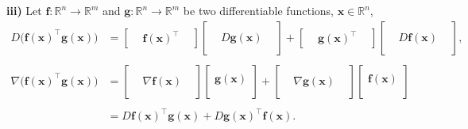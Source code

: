 \documentclass[12pt,thmsa]{article}
\begin{document}
\noindent
\textbf{iii)} Let \( \boldsymbol{f}: \mathbb{R}^{n} \rightarrow \mathbb{R}^{m}\) and \( \boldsymbol{g}: \mathbb{R}^{n} \rightarrow \mathbb{R}^{m}\) be two differentiable functions, \(\boldsymbol{x} \in \mathbb{R}^{n}\),
\[ 
\begin{aligned}
	D \bigg (\boldsymbol{f}(\boldsymbol{x})^{\top} \boldsymbol{g}(\boldsymbol{x}) \bigg )
	& = \left[ \begin{array}{ccc} & \boldsymbol{f}(\boldsymbol{x})^{\top} & \end{array} \right]
		\left[ \begin{array}{ccc} & & \\ & D \boldsymbol{g}(\boldsymbol{x}) & \\ & & \end{array} \right]
		+ \left[ \begin{array}{ccc} & \boldsymbol{g}(\boldsymbol{x})^{\top} & \end{array} \right]
		\left[ \begin{array}{ccc} & & \\ & 	D \boldsymbol{f}(\boldsymbol{x})  & \\ & & \end{array} \right], \\
	& \\
	\nabla \bigg (\boldsymbol{f}(\boldsymbol{x})^{\top} \boldsymbol{g}(\boldsymbol{x}) \bigg )
	& = \left[ \begin{array}{ccc} & & \\ &  \nabla \boldsymbol{f}(\boldsymbol{x}) & \\ & & \end{array} \right]
		\left[\begin{array}{c}\\  \boldsymbol{g}(\boldsymbol{x}) \\  \\ \end{array} \right ] 
   		+ \left[ \begin{array}{ccc} & & \\ &  \nabla \boldsymbol{g} (\boldsymbol{x}) & \\ & & \end{array} \right]
   		\left[\begin{array}{c}\\  \boldsymbol{f}(\boldsymbol{x}) \\  \\ \end{array} \right]  \\
   	& \\
   	& = D \boldsymbol{f}(\boldsymbol{x})^{\top} \boldsymbol{g}(\boldsymbol{x}) + 
   		  D \boldsymbol{g}(\boldsymbol{x})^{\top} \boldsymbol{f}(\boldsymbol{x}). \\
\end{aligned}
\]
\end{document}
